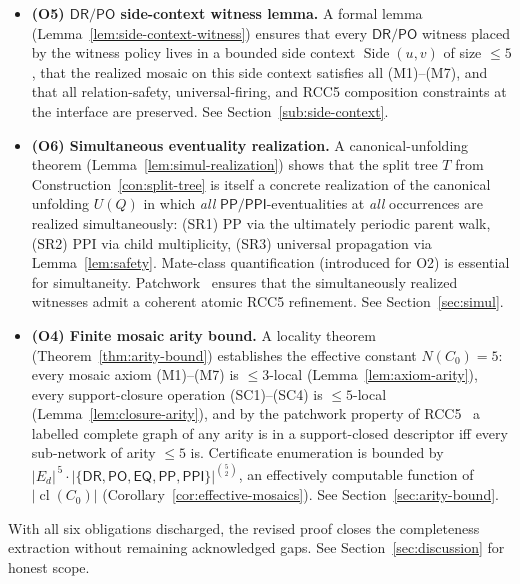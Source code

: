\documentclass[11pt]{article}
\theoremstyle{definition}
\theoremstyle{remark}
\newcommand{\DR}{\mathsf{DR}}
\newcommand{\PO}{\mathsf{PO}}
\newcommand{\PP}{\mathsf{PP}}
\newcommand{\PPI}{\mathsf{PPI}}
\newcommand{\EQ}{\mathsf{EQ}}
\newcommand{\Base}{\{\DR,\PO,\EQ,\PP,\PPI\}}
\newcommand{\cl}{\operatorname{cl}}
\newcommand{\Side}{\operatorname{Side}}
\begin{document}
\begin{center}
{{\begin{itemize}[leftmargin=1.5em,itemsep=2pt,topsep=2pt]
  Section~\ref{sec:eq-normalization}.
\item \textbf{(O5) $\DR/\PO$ side-context witness lemma.}\; A formal
  lemma (Lemma~\ref{lem:side-context-witness}) ensures that every
  $\DR/\PO$ witness placed by the witness policy lives in a
  bounded side context $\Side(u,v)$ of size $\le 5$, that the
  realized mosaic on this side context satisfies all (M1)--(M7), and
  that all relation-safety, universal-firing, and RCC5 composition
  constraints at the interface are preserved.  See
  Section~\ref{sub:side-context}.
\item \textbf{(O6) Simultaneous eventuality realization.}\; A
  canonical-unfolding theorem (Lemma~\ref{lem:simul-realization})
  shows that the split tree $T$ from
  Construction~\ref{con:split-tree} is itself a concrete realization
  of the canonical unfolding $U(Q)$ in which \emph{all}
  $\PP/\PPI$-eventualities at \emph{all} occurrences are realized
  simultaneously: (SR1) PP via the ultimately periodic parent walk,
  (SR2) PPI via child multiplicity, (SR3) universal propagation via
  Lemma~\ref{lem:safety}.  Mate-class quantification (introduced for
  O2) is essential for simultaneity.  Patchwork~\cite{RenzNebel}
  ensures that the simultaneously realized witnesses admit a
  coherent atomic RCC5 refinement.  See Section~\ref{sec:simul}.
\item \textbf{(O4) Finite mosaic arity bound.}\; A locality theorem
  (Theorem~\ref{thm:arity-bound}) establishes the effective constant
  $N(C_0)=5$: every mosaic axiom (M1)--(M7) is $\le 3$-local
  (Lemma~\ref{lem:axiom-arity}), every support-closure operation
  (SC1)--(SC4) is $\le 5$-local (Lemma~\ref{lem:closure-arity}), and
  by the patchwork property of RCC5~\cite{RenzNebel} a labelled
  complete graph of any arity is in a support-closed descriptor iff
  every sub-network of arity $\le 5$ is.  Certificate enumeration is
  bounded by $|E_d|^{\,5}\cdot|\Base|^{\binom{5}{2}}$, an effectively
  computable function of $|\cl(C_0)|$
  (Corollary~\ref{cor:effective-mosaics}).  See
  Section~\ref{sec:arity-bound}.
\end{itemize}
With all six obligations discharged, the revised proof closes the
completeness extraction without remaining acknowledged gaps.  See
Section~\ref{sec:discussion} for honest scope.
}}
\end{center}
\end{document}
